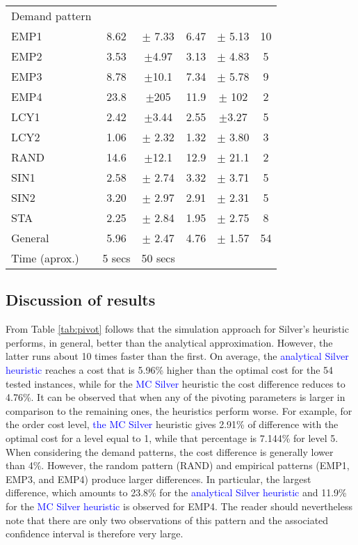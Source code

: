 \documentclass{tPRS2e}
\newcommand{\blue}{\textcolor{blue}}
\begin{document}
\begin{table}[]
\begin{tabular}{lcc|cc|c}
Demand pattern & & &  &      \\
EMP1          & 8.62    &$\pm$ 7.33 & 6.47  &$\pm$ 5.13 & 10 \\
EMP2          & 3.53 &$\pm$4.97  & 3.13 &$\pm$ 4.83     & 5 \\
EMP3          & 8.78  &$\pm$10.1  & 7.34  &$\pm$ 5.78   & 9  \\
EMP4       & 23.8 &$\pm$205          & 11.9 & $\pm$ 102 & 2   \\
LCY1          & 2.42 &$\pm$3.44   & 2.55 &$\pm$3.27     & 5 \\
LCY2          & 1.06 &$\pm$ 2.32  & 1.32 &$\pm$ 3.80    & 3\\
RAND          & 14.6 &$\pm$12.1   & 12.9&$\pm$ 21.1     & 2\\
SIN1          & 2.58 &$\pm$ 2.74   & 3.32 &$\pm$ 3.71   & 5\\
SIN2          & 3.20 &$\pm$ 2.97   & 2.91 &$\pm$ 2.31   & 5\\
STA           & 2.25 &$\pm$ 2.84  & 1.95 &$\pm$ 2.75    & 8\\ \hline
\hline
General       & 5.96  &$\pm$ 2.47  & 4.76   &$\pm$   1.57  & 54   \\ \hline
Time (aprox.) & 5 secs                         & 50 secs                       
\end{tabular}
\end{table}
\subsection{Discussion of results}
\label{sec:discussion}
From Table \ref{tab:pivot} \blue{} follows that the simulation approach for Silver's heuristic performs, in general, better than the analytical approximation. However, the latter runs about 10 times faster than the first. On average, the \blue{analytical Silver heuristic} reaches a cost that is 5.96\% higher than the optimal cost for the 54 tested instances, while for the \blue{MC Silver} heuristic the cost difference reduces to 4.76\%. It can be observed that when any of the pivoting parameters is larger in comparison to the remaining ones, the heuristics perform worse. For example, for the order cost level, \blue{the MC Silver} heuristic  gives 2.91\% of difference with the optimal cost for a level equal to 1, while that percentage is 7.144\% for level 5.
When considering the demand patterns, the cost difference is generally lower than 4\%. However, the random pattern (RAND) and empirical patterns (EMP1, EMP3, and EMP4) produce larger differences. In particular, the largest difference, which amounts to 23.8\% for the \blue{analytical Silver heuristic} and 11.9\% for the \blue{MC Silver heuristic} is observed for EMP4. The reader should nevertheless note that there are only two observations of this pattern and the associated confidence interval is therefore very large.
\end{document}
